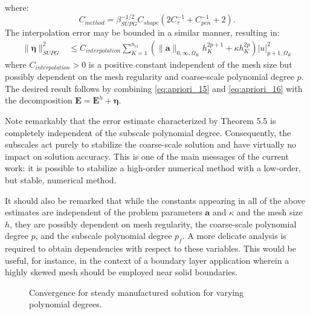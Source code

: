\documentclass[11pt]{article}
\newenvironment{proof}[1][Proof]{\begin{trivlist}
\item[\hskip \labelsep {\bfseries #1}]}{\end{trivlist}}
\newcommand{\qed}{\nobreak \ifvmode \relax \else
      \ifdim\lastskip<1.5em \hskip-\lastskip
      \hskip1.5em plus0em minus0.5em \fi \nobreak
      \vrule height0.75em width0.5em depth0.25em\fi}
\begin{document}
\begin{proof}
where:
\begin{equation}
C_{method} = \beta_{SUPG}^{-1/2} C_{shape} \left( 2 C_{\tau}^{-1} + C_{pen}^{-1} + 2 \right). \nonumber
\end{equation}
The interpolation error may be bounded in a similar manner, resulting in:
\begin{align}
\| \boldsymbol{\eta} \|^2_{SUPG} &\leq C_{interpolation} \sum_{K=1}^{n_{el}} \left( \| \bm{a} \|_{0,\infty,\Omega_K} h^{2p+1}_K + \kappa h^{2p}_K \right) | u |^2_{p+1,\Omega_K} \label{eq:apriori_16}
\end{align}
where $C_{interpolation} > 0$ is a positive constant independent of the mesh size but possibly dependent on the mesh regularity and coarse-scale polynomial degree $p$.  The desired result follows by combining \eqref{eq:apriori_15} and \eqref{eq:apriori_16} with the decomposition $\textbf{E} = \textbf{E}^h + \boldsymbol{\eta}$.
\qed
\end{proof}

Note remarkably that the error estimate characterized by Theorem 5.5 is completely independent of the subscale polynomial degree.  Consequently, the subscales act purely to stabilize the coarse-scale solution and have virtually no impact on solution accuracy.  This is one of the main messages of the current work: it is possible to stabilize a high-order numerical method with a low-order, but stable, numerical method.

It should also be remarked that while the constants appearing in all of the above estimates are independent of the problem parameters $\bm{a}$ and $\kappa$ and the mesh size $h$, they are possibly dependent on mesh regularity, the coarse-scale polynomial degree $p$, and the subscale polynomial degree $p_f$.  A more delicate analysis is required to obtain dependencies with respect to these variables.  This would be useful, for instance, in the context of a boundary layer application wherein a highly skewed mesh should be employed near solid boundaries.

\begin{figure}[b!]
  \begin{center}
    \caption{Convergence for steady manufactured solution for varying polynomial degrees.}
    \label{fig:convergence}
  \end{center}
\end{figure}
\end{document}
